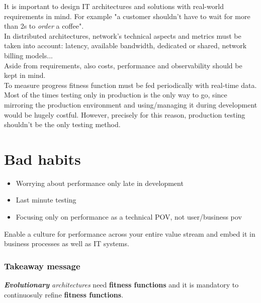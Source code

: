 It is important to design IT architectures and solutions with real-world requirements in mind.
For example "a customer shouldn't have to wait for more than 2s to \textit{order} a coffee".\\
In distributed architectures, network's technical aspects and metrics must be taken into account: latency, available bandwidth, dedicated or shared, network billing models...\\
Aside from requirements, also costs, performance and observability should be kept in mind.\\
To measure progress fitness function must be fed periodically with real-time data.
\nl
Most of the times testing only in production is the only way to go,
since mirroring the production environment and using/managing it during development would be hugely costful.
However, precisely for this reason, production testing shouldn't be the only testing method.

\section{Bad habits}
\begin{itemize}
    \item Worrying about performance only late in development
    \item Last minute testing
    \item Focusing only on performance as a technical POV,
    not user/business pov
\end{itemize}

Enable a culture for performance across your entire value stream and
embed it in business processes as well as IT systems.\nl

\subsubsection{Takeaway message}
\textit{\textbf{Evolutionary} architectures} need \textbf{fitness functions} and it is mandatory to
continuosuly refine \textbf{fitness functions}.
